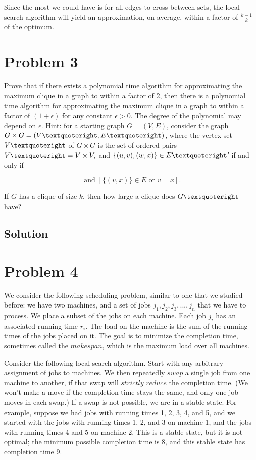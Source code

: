 \documentclass[11pt]{article}
\begin{document}
Since the most we could have is for all edges to cross between sets, the local search algorithm will yield an approximation, on average, within a factor of $\frac{k-1}{k}$ of the optimum.

\section{Problem 3}
Prove that if there exists a polynomial time algorithm for approximating the maximum clique in a graph to within a factor of 2, then there is a polynomial time algorithm for approximating the maximum clique in a graph to within a factor of $(1 + \epsilon)$ for any constant $\epsilon > 0$. The degree of the polynomial may depend on $\epsilon$. Hint: for a starting graph $G = (V,E)$, consider the graph $G \times G = (V \textquoteright ,E\textquoteright)$, where the vertex set $V\textquoteright$ of $G \times G$ is the set of ordered pairs $V\textquoteright = V \times V,$ and $\{(u,v),(w,x)\} \in E\textquoteright$′ if and only if

\begin{equation*}
[\{(u,w)\}\in E \text{ or } u=w] \text{ and } [\{(v,x)\}\in E \text{ or } v=x].			
\end{equation*}

If $G$ has a clique of size $k$, then how large a clique does $G\textquoteright$ have?

\subsection{Solution}

\section{Problem 4}

We consider the following scheduling problem, similar to one that we studied before: we have two machines, and a set of jobs $j_1, j_2, j_3,..., j_n$ that we have to process. We place a subset of the jobs on each machine. Each job $j_i$ has an associated running time $r_i$. The load on the machine is the sum of the running times of the jobs placed on it. The goal is to minimize the completion time, sometimes called the $makespan$, which is the maximum load over all machines.

Consider the following local search algorithm. Start with any arbitrary assignment of jobs to machines. We then repeatedly $swap$ a single job from one machine to another, if that swap will $strictly$ $reduce$ the completion time. (We won't make a move if the completion time stays the same, and only one job moves in each swap.) If a swap is not possible, we are in a stable state. For example, suppose we had jobs with running times 1, 2, 3, 4, and 5, and we started with the jobs with running times 1, 2, and 3 on machine 1, and the jobs with running times 4 and 5 on machine 2. This is a stable state, but it is not optimal; the minimum possible completion time is 8, and this stable state has completion time 9.
\end{document}
